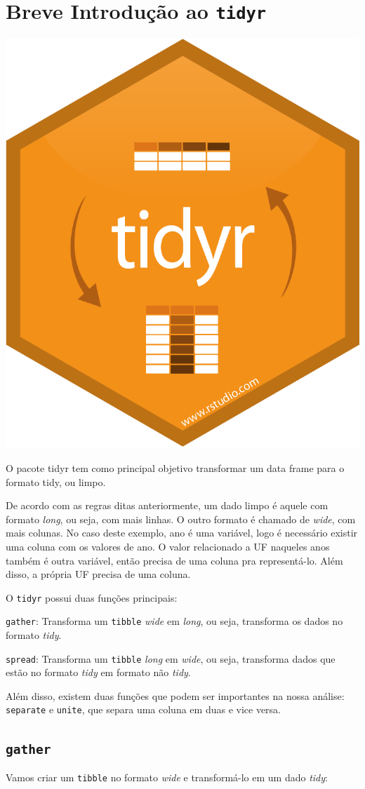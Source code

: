 \documentclass[]{book}
\begin{document}
\hypertarget{breve-introduuxe7uxe3o-ao-tidyr}{%
\section{\texorpdfstring{Breve Introdução ao \texttt{tidyr}}{Breve Introdução ao tidyr}}\label{breve-introduuxe7uxe3o-ao-tidyr}}

\begin{center}\includegraphics[width=0.25\linewidth]{imagens/tidyr} \end{center}

O pacote tidyr tem como principal objetivo transformar um data frame para o formato tidy, ou limpo.

De acordo com as regras ditas anteriormente, um dado limpo é aquele com formato \emph{long}, ou seja, com mais linhas. O outro formato é chamado de \emph{wide}, com mais colunas. No caso deste exemplo, ano é uma variável, logo é necessário existir uma coluna com os valores de ano. O valor relacionado a UF naqueles anos também é outra variável, então precisa de uma coluna pra representá-lo. Além disso, a própria UF precisa de uma coluna.

O \texttt{tidyr} possui duas funções principais:

\texttt{gather}: Transforma um \texttt{tibble} \emph{wide} em \emph{long}, ou seja, transforma os dados no formato \emph{tidy}.

\texttt{spread}: Transforma um \texttt{tibble} \emph{long} em \emph{wide}, ou seja, transforma dados que estão no formato \emph{tidy} em formato não \emph{tidy}.

Além disso, existem duas funções que podem ser importantes na nossa análise: \texttt{separate} e \texttt{unite}, que separa uma coluna em duas e vice versa.

\hypertarget{gather}{%
\subsection{\texorpdfstring{\texttt{gather}}{gather}}\label{gather}}

Vamos criar um \texttt{tibble} no formato \emph{wide} e transformá-lo em um dado \emph{tidy}:
\end{document}
